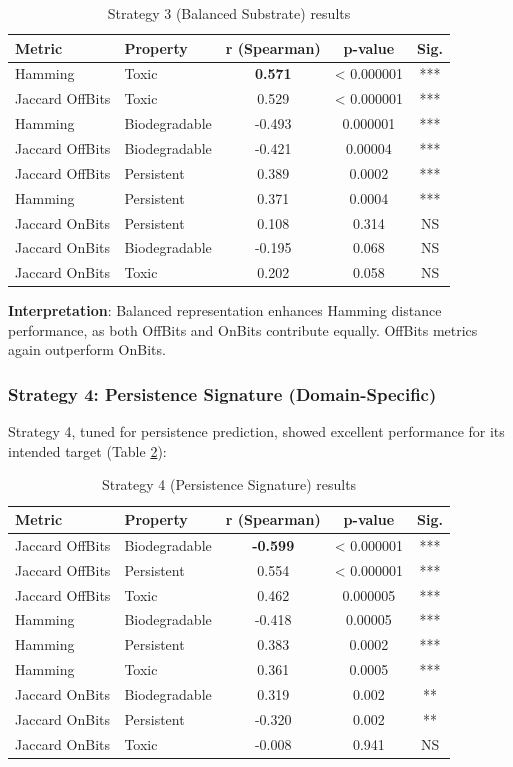 \documentclass[11pt,letterpaper]{article}
\begin{document}
\begin{table}[H]
\centering
\caption{Strategy 3 (Balanced Substrate) results}
\label{tab:strategy3}
\small
\begin{tabular}{llccc}
\toprule
\textbf{Metric} & \textbf{Property} & \textbf{r (Spearman)} & \textbf{p-value} & \textbf{Sig.} \\
\midrule
Hamming & Toxic & \textbf{0.571} & < 0.000001 & *** \\
Jaccard OffBits & Toxic & 0.529 & < 0.000001 & *** \\
Hamming & Biodegradable & -0.493 & 0.000001 & *** \\
Jaccard OffBits & Biodegradable & -0.421 & 0.00004 & *** \\
Jaccard OffBits & Persistent & 0.389 & 0.0002 & *** \\
Hamming & Persistent & 0.371 & 0.0004 & *** \\
Jaccard OnBits & Persistent & 0.108 & 0.314 & NS \\
Jaccard OnBits & Biodegradable & -0.195 & 0.068 & NS \\
Jaccard OnBits & Toxic & 0.202 & 0.058 & NS \\
\bottomrule
\end{tabular}
\end{table}

\textbf{Interpretation}: Balanced representation enhances Hamming distance performance, as both OffBits and OnBits contribute equally. OffBits metrics again outperform OnBits.

\subsubsection{Strategy 4: Persistence Signature (Domain-Specific)}

Strategy 4, tuned for persistence prediction, showed excellent performance for its intended target (Table \ref{tab:strategy4}):

\begin{table}[H]
\centering
\caption{Strategy 4 (Persistence Signature) results}
\label{tab:strategy4}
\small
\begin{tabular}{llccc}
\toprule
\textbf{Metric} & \textbf{Property} & \textbf{r (Spearman)} & \textbf{p-value} & \textbf{Sig.} \\
\midrule
Jaccard OffBits & Biodegradable & \textbf{-0.599} & < 0.000001 & *** \\
Jaccard OffBits & Persistent & 0.554 & < 0.000001 & *** \\
Jaccard OffBits & Toxic & 0.462 & 0.000005 & *** \\
Hamming & Biodegradable & -0.418 & 0.00005 & *** \\
Hamming & Persistent & 0.383 & 0.0002 & *** \\
Hamming & Toxic & 0.361 & 0.0005 & *** \\
Jaccard OnBits & Biodegradable & 0.319 & 0.002 & ** \\
Jaccard OnBits & Persistent & -0.320 & 0.002 & ** \\
Jaccard OnBits & Toxic & -0.008 & 0.941 & NS \\
\bottomrule
\end{tabular}
\end{table}
\end{document}

